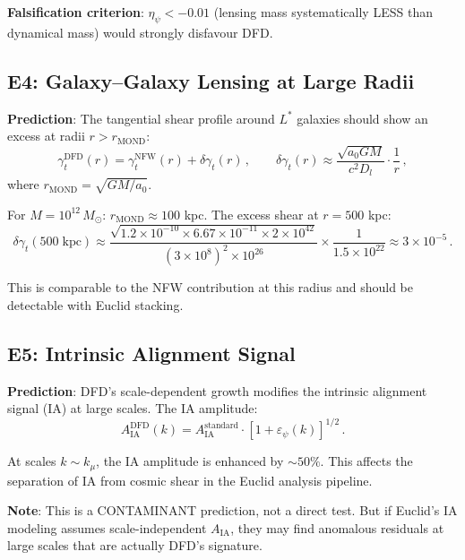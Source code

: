 \documentclass[11pt,a4paper]{article}
\begin{document}
\textbf{Falsification criterion}: $\eta_\psi < -0.01$ (lensing mass systematically LESS than dynamical mass) would strongly disfavour DFD.

\subsection{E4: Galaxy--Galaxy Lensing at Large Radii}

\textbf{Prediction}: The tangential shear profile around $L^*$ galaxies should show an excess at radii $r > r_{\mathrm{MOND}}$:
\begin{equation}
\gamma_t^{\mathrm{DFD}}(r) = \gamma_t^{\mathrm{NFW}}(r) + \delta\gamma_t(r)\,,\qquad \delta\gamma_t(r) \approx \frac{\sqrt{a_0 G M}}{c^2 D_l} \cdot \frac{1}{r}\,,
\end{equation}
where $r_{\mathrm{MOND}} = \sqrt{GM/a_0}$.

For $M = 10^{12}\,M_\odot$: $r_{\mathrm{MOND}} \approx 100$ kpc. The excess shear at $r = 500$ kpc:
\begin{equation}
\delta\gamma_t(500\;\mathrm{kpc}) \approx \frac{\sqrt{1.2 \times 10^{-10} \times 6.67 \times 10^{-11} \times 2 \times 10^{42}}}{(3 \times 10^8)^2 \times 10^{26}} \times \frac{1}{1.5 \times 10^{22}} \approx 3 \times 10^{-5}\,.
\end{equation}

This is comparable to the NFW contribution at this radius and should be detectable with Euclid stacking.

\subsection{E5: Intrinsic Alignment Signal}

\textbf{Prediction}: DFD's scale-dependent growth modifies the intrinsic alignment signal (IA) at large scales. The IA amplitude:
\begin{equation}
A_{\mathrm{IA}}^{\mathrm{DFD}}(k) = A_{\mathrm{IA}}^{\mathrm{standard}} \cdot [1 + \varepsilon_\psi(k)]^{1/2}\,.
\end{equation}

At scales $k \sim k_\mu$, the IA amplitude is enhanced by $\sim 50\%$. This affects the separation of IA from cosmic shear in the Euclid analysis pipeline.

\textbf{Note}: This is a CONTAMINANT prediction, not a direct test. But if Euclid's IA modeling assumes scale-independent $A_{\mathrm{IA}}$, they may find anomalous residuals at large scales that are actually DFD's signature.
\end{document}
